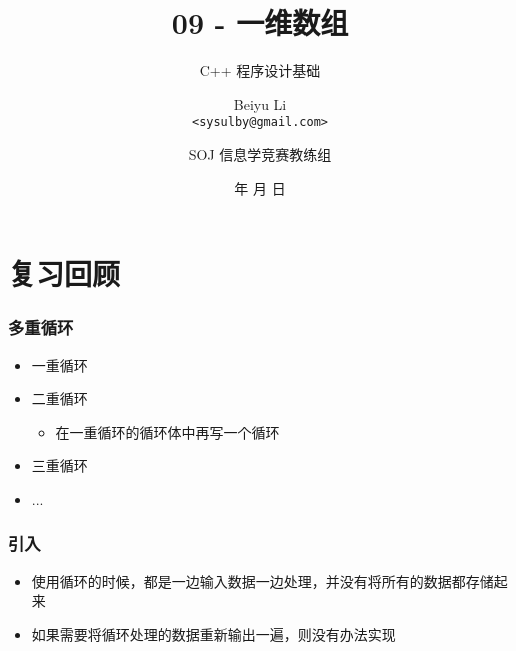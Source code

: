 \title[09 - 一维数组]
{09 - 一维数组}

\subtitle{C++ 程序设计基础}

\author[Beiyu Li]
{Beiyu Li\\
\texttt{<sysulby@gmail.com>}}


\date[\today]
{\number\year 年 \number\month 月 \number\day 日}




\author[sysulby]
{SOJ 信息学竞赛教练组}

\begin{frame}
    \titlepage
\end{frame}
\setcounter{framenumber}{0} %


\section{复习回顾}

\begin{frame}[fragile]
    \frametitle{多重循环}

    \begin{itemize}[<+->]
        \item 一重循环
        \item 二重循环
            \begin{itemize}
                \item 在一重循环的循环体中再写一个循环
            \end{itemize}
        \item 三重循环
        \item ...
    \end{itemize}
\end{frame}

\begin{frame}[fragile]
    \frametitle{引入}

    \begin{itemize}[<+->]
        \item 使用循环的时候，都是一边输入数据一边处理，并没有将所有的数据都存储起来
        \item 如果需要将循环处理的数据重新输出一遍，则没有办法实现
    \end{itemize}
\end{frame}

